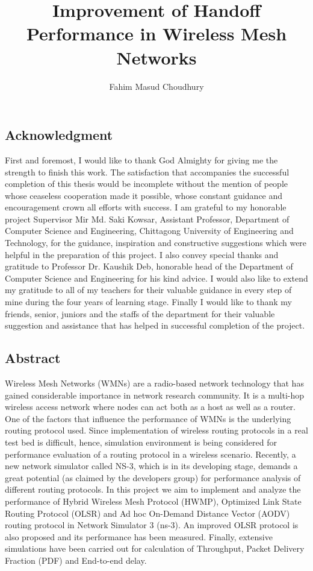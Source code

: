 \documentclass[12pt,a4paper]{report}
\author{Fahim Masud Choudhury}
\title{Improvement of Handoff Performance in Wireless Mesh Networks}
\begin{document}
\maketitle
\tableofcontents
\listoffigures
\listoftables

\newpage
\begin{center}
\section*{Acknowledgment}
\justify
First and foremost, I would like to thank God Almighty for giving me the strength to finish this work. The satisfaction that accompanies the successful completion of this thesis would be incomplete without the mention of people whose ceaseless cooperation made it possible, whose constant guidance and encouragement crown all efforts with success. I am grateful to my honorable project Supervisor Mir Md. Saki Kowsar, Assistant Professor, Department of Computer Science and Engineering, Chittagong University of Engineering and Technology, for the guidance, inspiration and constructive suggestions which were helpful in the preparation of this project. I also convey special thanks and gratitude to Professor Dr. Kaushik Deb, honorable head of the Department of Computer Science and Engineering for his kind advice. I would also like to extend my gratitude to all of my teachers for their valuable guidance in every step of mine during the four years of learning stage. Finally I would like to thank my friends, senior, juniors and the staffs of the department for their valuable suggestion and assistance that has helped in successful completion of the project.
\end{center}


\newpage
\begin{center}
\section*{Abstract}
\justify
Wireless Mesh Networks (WMNs) are a radio-based network technology that has gained considerable importance in network research community. It is a multi-hop wireless access network where nodes can act both as a host as well as a router. One of the factors that influence the performance of WMNs is the underlying routing protocol used. Since implementation of wireless routing protocols in a real test bed is difficult, hence, simulation environment is being considered for performance evaluation of a routing protocol in a wireless scenario. Recently, a new network simulator called NS-3, which is in its developing stage, demands a great potential (as claimed by the developers group) for performance analysis of different routing protocols. In this project we aim to implement and analyze the performance of Hybrid Wireless Mesh Protocol (HWMP), Optimized Link State Routing Protocol (OLSR) and Ad hoc On-Demand Distance Vector (AODV) routing protocol in Network Simulator 3 (ns-3). An improved OLSR protocol is also proposed and its performance has been measured. Finally, extensive simulations have been carried out for calculation of Throughput, Packet Delivery Fraction (PDF) and End-to-end delay.

\end{center}
\end{document}
